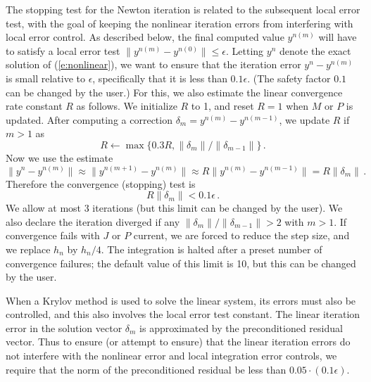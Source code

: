 The stopping test for the Newton iteration is related to the
subsequent local error test, with the goal of keeping the nonlinear
iteration errors from interfering with local error control.  As
described below, the final computed value $y^{n(m)}$ will have to
satisfy a local error test $\|y^{n(m)} - y^{n(0)}\| \leq \epsilon$.
Letting $y^n$ denote the exact solution of (\ref{e:nonlinear}), we want
to ensure that the iteration error $y^n - y^{n(m)}$ is small relative
to $\epsilon$, specifically that it is less than $0.1 \epsilon$.
(The safety factor $0.1$ can be changed by the user.)  For this, we
also estimate the linear convergence rate constant $R$ as follows.
We initialize $R$ to 1, and reset $R = 1$ when $M$ or $P$ is updated.
After computing a correction $\delta_m = y^{n(m)}-y^{n(m-1)}$, we
update $R$ if $m > 1$ as
\begin{equation*}
  R \leftarrow \max\{0.3R , \|\delta_m\| / \|\delta_{m-1}\| \} \, . 
\end{equation*}
Now we use the estimate
\begin{equation*}
  \| y^n - y^{n(m)} \| \approx \| y^{n(m+1)} - y^{n(m)} \| 
  \approx R \| y^{n(m)} - y^{n(m-1)} \|  =  R \|\delta_m \| \, . 
\end{equation*}
Therefore the convergence (stopping) test is 
\begin{equation*}
  R \|\delta_m \| < 0.1 \epsilon \, .
\end{equation*}
We allow at most 3 iterations (but this limit can be changed by the
user).  We also declare the iteration diverged if any $\|\delta_m\| /
\|\delta_{m-1}\| > 2$ with $m > 1$. If convergence fails with $J$ or
$P$ current, we are forced to reduce the step size, and we replace
$h_n$ by $h_n/4$.  The integration is halted after a preset number
of convergence failures; the default value of this limit is 10, 
but this can be changed by the user.

When a Krylov method is used to solve the linear system, its errors must also be
controlled, and this also involves the local error test constant.  The
linear iteration error in the solution vector $\delta_m$ is
approximated by the preconditioned residual vector.  Thus to ensure
(or attempt to ensure) that the linear iteration errors do not
interfere with the nonlinear error and local integration error
controls, we require that the norm of the preconditioned residual
be less than $0.05 \cdot (0.1 \epsilon)$.

